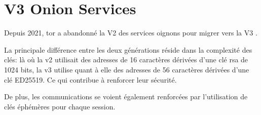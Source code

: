 \section{V3 Onion Services}\label{sec:v3}

Depuis 2021, \acrshort{tor} a abandonné la V2 des services oignons pour migrer vers la V3 \cite[A Comprehensive and Long-term Evaluation of \acrshort{tor} V3 Onion Services]{wang_comprehensive_2023} \cite[On the state of V3 onion services]{hoeller_state_2021}.

La principale différence entre les deux générations réside dans la complexité des clés: là où la v2 utilisait des adresses de 16 caractères dérivées d'une clé \acrshort{rsa} de 1024 bits, la v3 utilise quant à elle des adresses de 56 caractères dérivées d'une clé ED25519.
Ce qui contribue à renforcer leur sécurité.

De plus, les communications se voient également renforcées par l'utilisation de clés éphémères pour chaque session.

% 